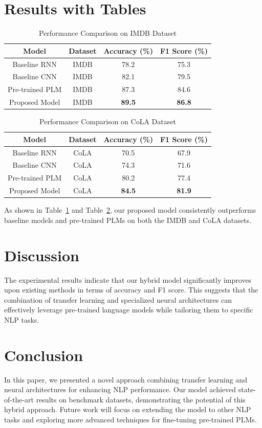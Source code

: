 \documentclass{article}
\begin{document}
\section{Results with Tables}
\begin{table}[h]
\centering
\begin{tabular}{|c|c|c|c|}
\hline
Model & Dataset & Accuracy (\%) & F1 Score (\%) \\
\hline
Baseline RNN & IMDB & 78.2 & 75.3 \\
Baseline CNN & IMDB & 82.1 & 79.5 \\
Pre-trained PLM & IMDB & 87.3 & 84.6 \\
Proposed Model & IMDB & \textbf{89.5} & \textbf{86.8} \\
\hline
\end{tabular}
\caption{Performance Comparison on IMDB Dataset}
\label{tab:imdb_results}
\end{table}

\begin{table}[h]
\centering
\begin{tabular}{|c|c|c|c|}
\hline
Model & Dataset & Accuracy (\%) & F1 Score (\%) \\
\hline
Baseline RNN & CoLA & 70.5 & 67.9 \\
Baseline CNN & CoLA & 74.3 & 71.6 \\
Pre-trained PLM & CoLA & 80.2 & 77.4 \\
Proposed Model & CoLA & \textbf{84.5} & \textbf{81.9} \\
\hline
\end{tabular}
\caption{Performance Comparison on CoLA Dataset}
\label{tab:cola_results}
\end{table}

As shown in Table~\ref{tab:imdb_results} and Table~\ref{tab:cola_results}, our proposed model consistently outperforms baseline models and pre-trained PLMs on both the IMDB and CoLA datasets.

\section{Discussion}
The experimental results indicate that our hybrid model significantly improves upon existing methods in terms of accuracy and F1 score. This suggests that the combination of transfer learning and specialized neural architectures can effectively leverage pre-trained language models while tailoring them to specific NLP tasks.

\section{Conclusion}
In this paper, we presented a novel approach combining transfer learning and neural architectures for enhancing NLP performance. Our model achieved state-of-the-art results on benchmark datasets, demonstrating the potential of this hybrid approach. Future work will focus on extending the model to other NLP tasks and exploring more advanced techniques for fine-tuning pre-trained PLMs.
\end{document}
